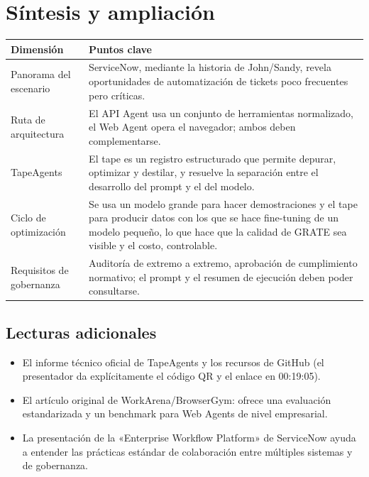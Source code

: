 \section{Síntesis y ampliación}
\begin{tabular}{@{}p{4.5cm}p{11cm}@{}}
\toprule
Dimensión & Puntos clave \\
\midrule
Panorama del escenario & ServiceNow, mediante la historia de John/Sandy, revela oportunidades de automatización de tickets poco frecuentes pero críticas. \\
Ruta de arquitectura & El API Agent usa un conjunto de herramientas normalizado, el Web Agent opera el navegador; ambos deben complementarse. \\
TapeAgents & El tape es un registro estructurado que permite depurar, optimizar y destilar, y resuelve la separación entre el desarrollo del prompt y el del modelo. \\
Ciclo de optimización & Se usa un modelo grande para hacer demostraciones y el tape para producir datos con los que se hace fine-tuning de un modelo pequeño, lo que hace que la calidad de GRATE sea visible y el costo, controlable. \\
Requisitos de gobernanza & Auditoría de extremo a extremo, aprobación de cumplimiento normativo; el prompt y el resumen de ejecución deben poder consultarse. \\
\bottomrule
\end{tabular}

\subsection{Lecturas adicionales}
\begin{itemize}
    \item El informe técnico oficial de TapeAgents y los recursos de GitHub (el presentador da explícitamente el código QR y el enlace en 00:19:05).\newline
    \item El artículo original de WorkArena/BrowserGym: ofrece una evaluación estandarizada y un benchmark para Web Agents de nivel empresarial.
    \item La presentación de la «Enterprise Workflow Platform» de ServiceNow ayuda a entender las prácticas estándar de colaboración entre múltiples sistemas y de gobernanza.
\end{itemize}


